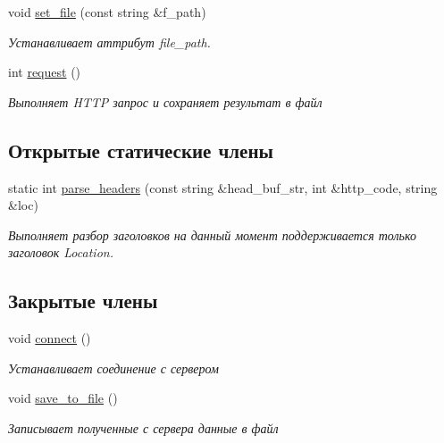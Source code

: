 \begin{DoxyCompactItemize}
\mbox{\label{classHTTPClient_a40b352eec8fade25eac9bd56b6e4107d}} 
void \mbox{\hyperlink{classHTTPClient_a40b352eec8fade25eac9bd56b6e4107d}{set\+\_\+file}} (const string \&f\+\_\+path)
\begin{DoxyCompactList}\small\item\em Устанавливает аттрибут file\+\_\+path. \end{DoxyCompactList}\item 
int \mbox{\hyperlink{classHTTPClient_a7daca6af4373fb8a40dd5653226d74b8}{request}} ()
\begin{DoxyCompactList}\small\item\em Выполняет H\+T\+TP запрос и сохраняет результат в файл \end{DoxyCompactList}\end{DoxyCompactItemize}
\subsection*{Открытые статические члены}
\begin{DoxyCompactItemize}
\item 
static int \mbox{\hyperlink{classHTTPClient_af789bae49b3188e7370c576d228b4f55}{parse\+\_\+headers}} (const string \&head\+\_\+buf\+\_\+str, int \&http\+\_\+code, string \&loc)
\begin{DoxyCompactList}\small\item\em Выполняет разбор заголовков на данный момент поддерживается только заголовок Location. \end{DoxyCompactList}\end{DoxyCompactItemize}
\subsection*{Закрытые члены}
\begin{DoxyCompactItemize}
\item 
void \mbox{\hyperlink{classHTTPClient_a470da28450e7a79f87c16e6f24af15c3}{connect}} ()
\begin{DoxyCompactList}\small\item\em Устанавливает соединение с сервером \end{DoxyCompactList}\item 
void \mbox{\hyperlink{classHTTPClient_a8b630cb2b3669bd770007f1e526a7c46}{save\+\_\+to\+\_\+file}} ()
\begin{DoxyCompactList}\small\item\em Записывает полученные с сервера данные в файл \end{DoxyCompactList}\end{DoxyCompactItemize}
